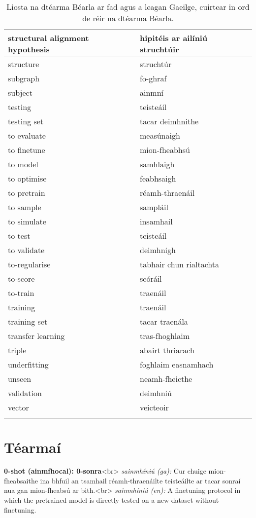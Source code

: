 \documentclass{article}
\begin{document}
\begin{longtable}{|l|l|}
		structural alignment hypothesis&hipitéis ar ailíniú struchtúir\\ \hline 
		structure&struchtúr\\ \hline 
		subgraph&fo-ghraf\\ \hline 
		subject&ainmní\\ \hline 
		testing&teisteáil\\ \hline 
		testing set&tacar deimhnithe\\ \hline 
		to evaluate&measúnaigh\\ \hline 
		to finetune&mion-fheabhsú\\ \hline 
		to model&samhlaigh\\ \hline 
		to optimise&feabhsaigh\\ \hline 
		to pretrain&réamh-thraenáil\\ \hline 
		to sample&sampláil\\ \hline 
		to simulate&insamhail\\ \hline 
		to test&teisteáil\\ \hline 
		to validate&deimhnigh\\ \hline 
		to-regularise&tabhair chun rialtachta\\ \hline 
		to-score&scóráil\\ \hline 
		to-train&traenáil\\ \hline 
		training&traenáil\\ \hline 
		training set&tacar traenála\\ \hline 
		transfer learning&tras-fhoghlaim\\ \hline 
		triple&abairt thriarach\\ \hline 
		underfitting&foghlaim easnamhach\\ \hline 
		unseen&neamh-fheicthe\\ \hline 
		validation&deimhniú\\ \hline 
		vector&veicteoir\\ \hline 
\caption{Liosta na dtéarma Béarla ar fad agus a leagan Gaeilge, cuirtear in ord de réir na dtéarma Béarla.}
\label{tab-terms-en-ga}
\end{longtable}

\section{Téarmaí}
\textbf{0-shot (ainmfhocal): 0-sonra}<br>
\textit{sainmhíniú (ga):} Cur chuige mion-fheabsaithe ina bhfuil an tsamhail réamh-thraenáilte teisteáilte ar tacar sonraí nua gan mion-fheabsú ar bith.<br>
\textit{sainmhíniú (en):} A finetuning protocol in which the pretrained model is directly tested on a new dataset without finetuning.
\end{document}
